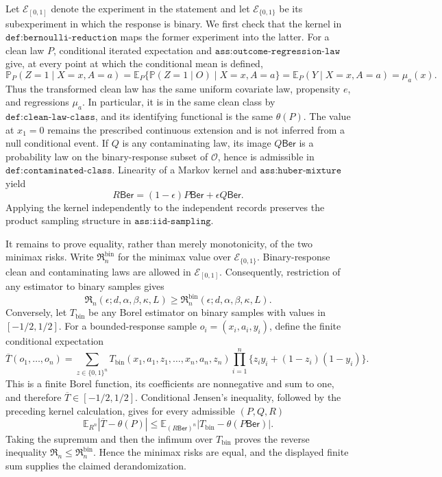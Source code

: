 Let \(\mathcal E_{[0,1]}\) denote the experiment in the statement and let \(\mathcal E_{\{0,1\}}\) be its subexperiment in which the response is binary.  We first check that the kernel in \(\texttt{def:bernoulli-reduction}\) maps the former experiment into the latter.  For a clean law \(P\), conditional iterated expectation and \(\texttt{ass:outcome-regression-law}\) give, at every point at which the conditional mean is defined,
\[
 \mathbb P_P(Z=1\mid X=x,A=a)
 =\mathbb E_P\{\mathbb P(Z=1\mid O)\mid X=x,A=a\}
 =\mathbb E_P(Y\mid X=x,A=a)=\mu_a(x).
\]
Thus the transformed clean law has the same uniform covariate law, propensity \(e\), and regressions \(\mu_a\).  In particular, it is in the same clean class by \(\texttt{def:clean-law-class}\), and its identifying functional is the same \(\theta(P)\).  The value at \(x_1=0\) remains the prescribed continuous extension and is not inferred from a null conditional event.  If \(Q\) is any contaminating law, its image \(Q\mathsf{Ber}\) is a probability law on the binary-response subset of \(\mathcal O\), hence is admissible in \(\texttt{def:contaminated-class}\).  Linearity of a Markov kernel and \(\texttt{ass:huber-mixture}\) yield
\[
 R\mathsf{Ber}=(1-\epsilon)P\mathsf{Ber}+\epsilon Q\mathsf{Ber}.
\]
Applying the kernel independently to the independent records preserves the product sampling structure in \(\texttt{ass:iid-sampling}\).

It remains to prove equality, rather than merely monotonicity, of the two minimax risks.  Write \(\mathfrak R_n^{\mathrm{bin}}\) for the minimax value over \(\mathcal E_{\{0,1\}}\).  Binary-response clean and contaminating laws are allowed in \(\mathcal E_{[0,1]}\).  Consequently, restriction of any estimator to binary samples gives
\[
 \mathfrak R_n(\epsilon;d,\alpha,\beta,\kappa,L)
 \geq \mathfrak R_n^{\mathrm{bin}}(\epsilon;d,\alpha,\beta,\kappa,L).
\]
Conversely, let \(T_{\mathrm{bin}}\) be any Borel estimator on binary samples with values in \([-1/2,1/2]\).  For a bounded-response sample \(o_i=(x_i,a_i,y_i)\), define the finite conditional expectation
\[
 \overline T(o_1,\ldots,o_n)
 =\sum_{z\in\{0,1\}^n}T_{\mathrm{bin}}(x_1,a_1,z_1,\ldots,x_n,a_n,z_n)
   \prod_{i=1}^n\bigl\{z_i y_i+(1-z_i)(1-y_i)\bigr\}.
\]
This is a finite Borel function, its coefficients are nonnegative and sum to one, and therefore \(\overline T\in[-1/2,1/2]\).  Conditional Jensen's inequality, followed by the preceding kernel calculation, gives for every admissible \((P,Q,R)\)
\[
 \mathbb E_{R^n}|\overline T-\theta(P)|
 \leq
 \mathbb E_{(R\mathsf{Ber})^n}|T_{\mathrm{bin}}-\theta(P\mathsf{Ber})|.
\]
Taking the supremum and then the infimum over \(T_{\mathrm{bin}}\) proves the reverse inequality \(\mathfrak R_n\leq\mathfrak R_n^{\mathrm{bin}}\).  Hence the minimax risks are equal, and the displayed finite sum supplies the claimed derandomization.

